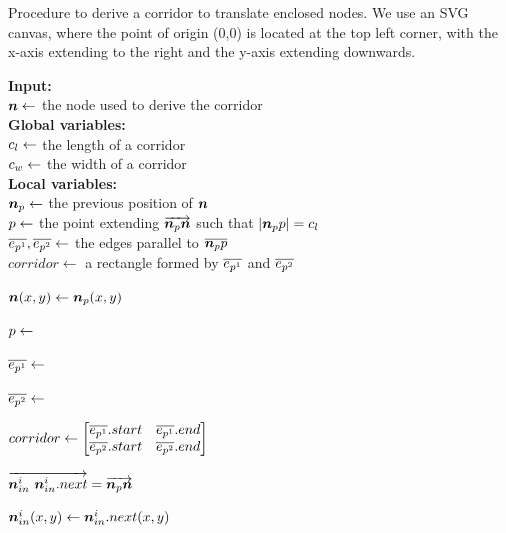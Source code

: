 \begin{algorithm}[tb!]
    \caption{Procedure to derive a corridor to translate enclosed nodes. We use an SVG canvas, where the point of origin (0,0) is located at the top left corner, with the x-axis extending to the right and the y-axis extending downwards.}\label{alg:derive corridor}

    \textbf{Input:} \\
    $ \bm{n} \gets $ the node used to derive the corridor \\

    \textbf{Global variables:} \\
    $ c_l \gets $ the length of a corridor \\
    $ c_w \gets $ the width of a corridor \\

    \textbf{Local variables:} \\
    $ \bm{n}_{p} \gets $ the previous position of $ \bm{n} $ \\
    $ p \gets $ the point extending $ \protect\overrightarrow{\bm{n}_{p}\bm{n}} $ such that $ \lvert \bm{n}_{p}p \rvert = c_l $\\
    $ \protect\overline{e_{p^1}}, \protect\overline{e_{p^2}} \gets $ the edges parallel to $ \protect\overline{\bm{n}_{p}p} $ \\
    $ corridor \gets $ a rectangle formed by $ \protect\overline{e_{p^1}} $ and $ \protect\overline{e_{p^2}} $ \\

    \begin{algorithmic}[1]
            \State $ \bm{n}(x,y) \gets \bm{n}_{p}(x,y) $

            \State $ p \gets $ 

            \State $ \protect\overline{e_{p^1}} \gets $ 

            \State $ \protect\overline{e_{p^2}} \gets $ 

            \State $ corridor \gets
                \begin{bmatrix}
                    \EdgeParallelA.start &
                    \EdgeParallelA.end \\

                    \EdgeParallelB.start &
                    \EdgeParallelB.end \\
                \end{bmatrix} $


                \State $ \protect\overrightarrow{\bm{n}_{in}^i ~\bm{n}_{in}^i.next} = \protect\overrightarrow{\bm{n}_{p}\bm{n}} $

                \State $ \bm{n}_{in}^i(x,y) \gets \bm{n}_{in}^i.next(x,y) $

            \EndFor
        \EndProcedure
    \end{algorithmic}
\end{algorithm}

